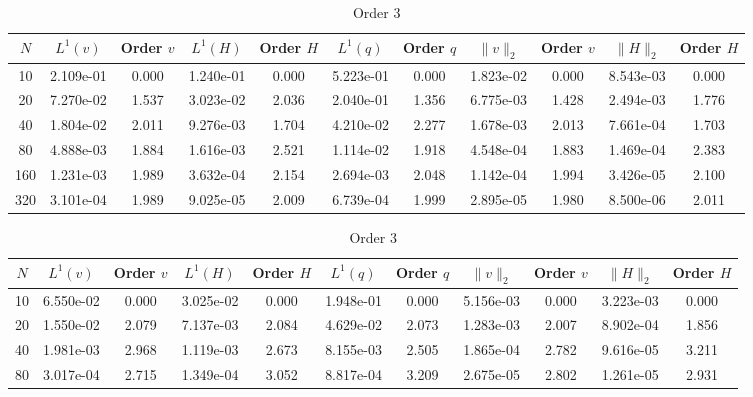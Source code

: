 \documentclass[english]{article}
\theoremstyle{thmstyleone}
\theoremstyle{thmstyletwo}
\theoremstyle{thmstylethree}
\begin{document}
\begin{table}[ht]
	\centering
	\caption{Subcritical Smooth}
	\label{tab:subcritical}
	\begin{adjustbox}{width=1\textwidth}
		\small
		\begin{subtable}{1.\linewidth}
			\centering
			\caption{Order 2}
			\begin{tabular}{ccccccccccc}
				\toprule
				$N$ & $L^1(v)$ & Order $v$ & $L^1(H)$ & Order $H$ & $L^1(q)$ & Order $q$ & $\|v\|_2$ & Order $v$ & $\|H\|_2$ & Order $H$ \\
				\midrule
				10 & 2.109e-01 & 0.000 & 1.240e-01 & 0.000 & 5.223e-01 & 0.000 & 1.823e-02 & 0.000 & 8.543e-03 & 0.000 \\
				20 & 7.270e-02 & 1.537 & 3.023e-02 & 2.036 & 2.040e-01 & 1.356 & 6.775e-03 & 1.428 & 2.494e-03 & 1.776 \\
				40 & 1.804e-02 & 2.011 & 9.276e-03 & 1.704 & 4.210e-02 & 2.277 & 1.678e-03 & 2.013 & 7.661e-04 & 1.703 \\
				80 & 4.888e-03 & 1.884 & 1.616e-03 & 2.521 & 1.114e-02 & 1.918 & 4.548e-04 & 1.883 & 1.469e-04 & 2.383 \\
				160 & 1.231e-03 & 1.989 & 3.632e-04 & 2.154 & 2.694e-03 & 2.048 & 1.142e-04 & 1.994 & 3.426e-05 & 2.100 \\
				320 & 3.101e-04 & 1.989 & 9.025e-05 & 2.009 & 6.739e-04 & 1.999 & 2.895e-05 & 1.980 & 8.500e-06 & 2.011 \\
				\bottomrule
			\end{tabular}
		\end{subtable}
	\end{adjustbox}
	\begin{adjustbox}{width=1\textwidth}
		\small
		\begin{subtable}{1.\linewidth}
			\centering
			\caption{Order 3}
				\begin{tabular}{ccccccccccc}
					\toprule
					$N$ & $L^1(v)$ & Order $v$ & $L^1(H)$ & Order $H$ & $L^1(q)$ & Order $q$ & $\|v\|_2$ & Order $v$ & $\|H\|_2$ & Order $H$ \\
					\midrule
					10 & 6.550e-02 & 0.000 & 3.025e-02 & 0.000 & 1.948e-01 & 0.000 & 5.156e-03 & 0.000 & 3.223e-03 & 0.000 \\
					20 & 1.550e-02 & 2.079 & 7.137e-03 & 2.084 & 4.629e-02 & 2.073 & 1.283e-03 & 2.007 & 8.902e-04 & 1.856 \\
					40 & 1.981e-03 & 2.968 & 1.119e-03 & 2.673 & 8.155e-03 & 2.505 & 1.865e-04 & 2.782 & 9.616e-05 & 3.211 \\
					80 & 3.017e-04 & 2.715 & 1.349e-04 & 3.052 & 8.817e-04 & 3.209 & 2.675e-05 & 2.802 & 1.261e-05 & 2.931 \\

\end{tabular}
\end{subtable}
\end{adjustbox}
\end{table}
\end{document}

